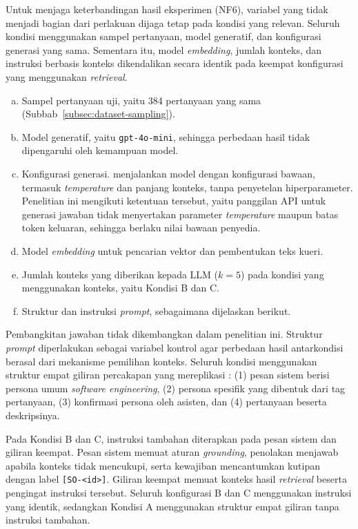 Untuk menjaga keterbandingan hasil eksperimen (NF6), variabel yang tidak menjadi bagian dari perlakuan dijaga tetap pada kondisi yang relevan. Seluruh kondisi menggunakan sampel pertanyaan, model generatif, dan konfigurasi generasi yang sama. Sementara itu, model \emph{embedding}, jumlah konteks, dan instruksi berbasis konteks dikendalikan secara identik pada keempat konfigurasi yang menggunakan \emph{retrieval}.
\begin{enumerate}[(a)]
    \item Sampel pertanyaan uji, yaitu 384 pertanyaan yang sama (Subbab~\ref{subsec:dataset-sampling}).
    \item Model generatif, yaitu \texttt{gpt-4o-mini}, sehingga perbedaan hasil tidak dipengaruhi oleh kemampuan model.
    \item Konfigurasi generasi. \textcite{DaSilva2025} menjalankan model dengan konfigurasi bawaan, termasuk \emph{temperature} dan panjang konteks, tanpa penyetelan hiperparameter. Penelitian ini mengikuti ketentuan tersebut, yaitu panggilan API untuk generasi jawaban tidak menyertakan parameter \emph{temperature} maupun batas token keluaran, sehingga berlaku nilai bawaan penyedia.
    \item Model \emph{embedding} untuk pencarian vektor dan pembentukan teks kueri.
    \item Jumlah konteks yang diberikan kepada LLM ($k{=}5$) pada kondisi yang menggunakan konteks, yaitu Kondisi B dan C.
    \item Struktur dan instruksi \emph{prompt}, sebagaimana dijelaskan berikut.
\end{enumerate}

Pembangkitan jawaban tidak dikembangkan dalam penelitian ini. Struktur \emph{prompt} diperlakukan sebagai variabel kontrol agar perbedaan hasil antarkondisi berasal dari mekanisme pemilihan konteks. Seluruh kondisi menggunakan struktur empat giliran percakapan yang mereplikasi \textcite{DaSilva2025}: (1) pesan sistem berisi persona umum \emph{software engineering}, (2) persona spesifik yang dibentuk dari tag pertanyaan, (3) konfirmasi persona oleh asisten, dan (4) pertanyaan beserta deskripsinya.

Pada Kondisi B dan C, instruksi tambahan diterapkan pada pesan sistem dan giliran keempat. Pesan sistem memuat aturan \emph{grounding}, penolakan menjawab apabila konteks tidak mencukupi, serta kewajiban mencantumkan kutipan dengan label \texttt{[SO-\textless id\textgreater]}. Giliran keempat memuat konteks hasil \emph{retrieval} beserta pengingat instruksi tersebut. Seluruh konfigurasi B dan C menggunakan instruksi yang identik, sedangkan Kondisi A menggunakan struktur empat giliran tanpa instruksi tambahan.

